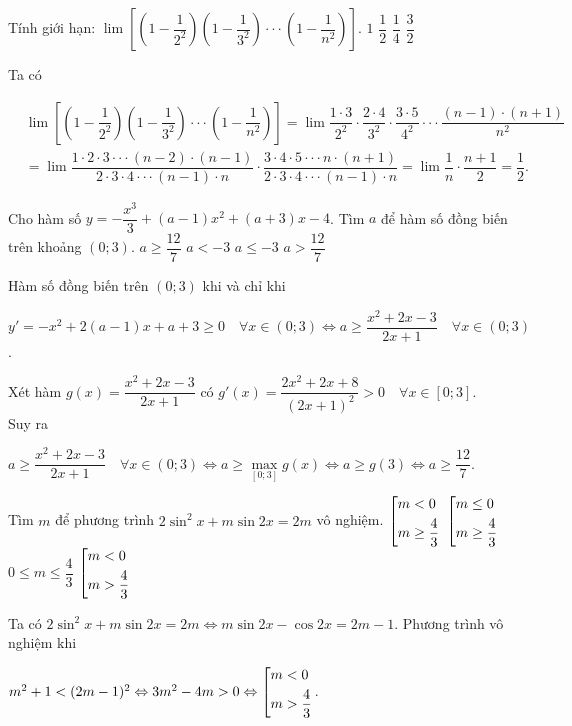 \begin{ex}%
Tính giới hạn: $\lim\left[\left(1-\dfrac{1}{2^2}\right)\left(1-\dfrac{1}{3^2}\right)\cdot\cdot\cdot\left(1-\dfrac{1}{n^2}\right)\right]$.
\choice
{$1$}
{\True $\dfrac{1}{2}$}
{$\dfrac{1}{4}$}
{$\dfrac{3}{2}$}
\loigiai
{Ta có
\begin{center}
$\begin{aligned}&\lim\left[\left(1-\dfrac{1}{2^2}\right)\left(1-\dfrac{1}{3^2}\right)\cdot\cdot\cdot\left(1-\dfrac{1}{n^2}\right)\right]
=\lim\dfrac{1\cdot 3}{2^2}\cdot\dfrac{2\cdot 4}{3^2}\cdot\dfrac{3\cdot 5}{4^2}\cdot\cdot\cdot\dfrac{(n-1)\cdot (n+1)}{n^2}\\
&=\lim\dfrac{1\cdot 2\cdot 3 \cdot\cdot\cdot (n-2)\cdot (n-1)}{2\cdot 3\cdot 4 \cdot\cdot\cdot (n-1)\cdot n}
\cdot\dfrac{3\cdot 4\cdot 5 \cdot\cdot\cdot  n\cdot (n+1)}{2\cdot 3\cdot 4 \cdot\cdot\cdot (n-1)\cdot n}=\lim\dfrac{1}{n}\cdot\dfrac{n+1}{2}=\dfrac{1}{2}.
\end{aligned}
$
\end{center}
}
\end{ex}


\begin{ex}%
Cho hàm số $y=-\dfrac{x^3}{3}+(a-1)x^2+(a+3)x-4$. Tìm $a$ để hàm số đồng biến trên khoảng $(0; 3)$.
\choice
{\True $a\geq\dfrac{12}{7}$}
{$a<-3$}
{$a\leq-3$}
{$a>\dfrac{12}{7}$}
\loigiai
{Hàm số đồng biến trên $(0; 3)$ khi và chỉ khi
\begin{center}$y'=-x^2+2(a-1)x+a+3\geq 0\quad\forall x\in(0; 3)\Leftrightarrow a\geq\dfrac{x^2+2x-3}{2x+1} \quad\forall x\in(0; 3)$.
\end{center}
Xét hàm $g(x)=\dfrac{x^2+2x-3}{2x+1}$ có $g'(x)=\dfrac{2x^2+2x+8}{(2x+1)^2}>0 \quad\forall x\in [0; 3]$.\\
Suy ra
\begin{center}
$a\geq\dfrac{x^2+2x-3}{2x+1} \quad\forall x\in(0; 3)\Leftrightarrow a\geq\underset{[0; 3]}{\max}g(x)\Leftrightarrow a\geq g(3)\Leftrightarrow a\geq\dfrac{12}{7}$.
\end{center}
}
\end{ex}



\begin{ex}%
Tìm $m$ để phương trình $2\sin^2x+m\sin2x=2m$ vô nghiệm.
\choice
{$\left[\begin{aligned}&m<0\\&m\geq\dfrac{4}{3}\end{aligned}\right.$}
{$\left[\begin{aligned}&m\leq0\\&m\geq\dfrac{4}{3}\end{aligned}\right.$}
{$0\leq m\leq\dfrac{4}{3}$}
{\True $\left[\begin{aligned}&m<0\\&m>\dfrac{4}{3}\end{aligned}\right.$}
\loigiai
{Ta có $2\sin^2x+m\sin2x=2m\Leftrightarrow m\sin2x-\cos2x=2m-1$.
Phương trình vô nghiệm khi
\begin{center}$m^2+1<(2m-1)^2\Leftrightarrow 3m^2-4m>0\Leftrightarrow\left[\begin{aligned}&m<0\\&m>\dfrac{4}{3}\end{aligned}\right.$.
\end{center}
}
\end{ex}



